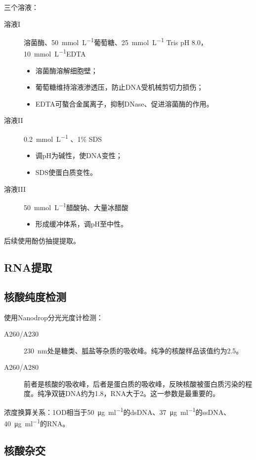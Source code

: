三个溶液：
\begin{description}
	\item[溶液I] 溶菌酶、\SI{50}{\mmol\per\L}葡萄糖、\SI{25}{\mmol\per\L} Tris pH 8.0，\SI{10}{\mmol\per\L}EDTA
	\begin{itemize}
		\item 溶菌酶溶解细胞壁；
		\item 葡萄糖维持溶液渗透压，防止DNA受机械剪切力损伤；
		\item EDTA可螯合金属离子，抑制DNase、促进溶菌酶的作用。
	\end{itemize}
	\item[溶液II] \SI{0.2}{\mmol\per\L} 、1\% SDS
	\begin{itemize}
		\item {}调pH为碱性，使DNA变性；
		\item SDS使蛋白质变性。
	\end{itemize}
	\item[溶液III] \SI{50}{\mmol\per\L}醋酸钠、大量冰醋酸
	\begin{itemize}
		\item 形成缓冲体系，调pH至中性。
	\end{itemize}
\end{description}

后续使用酚仿抽提提取。

\subsection{RNA提取}


\subsection{核酸纯度检测}

使用Nanodrop分光光度计检测：
\begin{description}
	\item[A260/A230] \SI{230}{\nm}处是糖类、胍盐等杂质的吸收峰。纯净的核酸样品该值约为2.5。
	\item[A260/A280] 前者是核酸的吸收峰，后者是蛋白质的吸收峰，反映核酸被蛋白质污染的程度。纯净双链DNA约为1.8，RNA大于2。这一参数是最重要的。
\end{description}

浓度换算关系：1OD相当于\SI{50}{\ug\per\ml}的dsDNA、\SI{37}{\ug\per\ml}的ssDNA、\SI{40}{\ug\per\ml}的RNA。



\subsection{核酸杂交}

